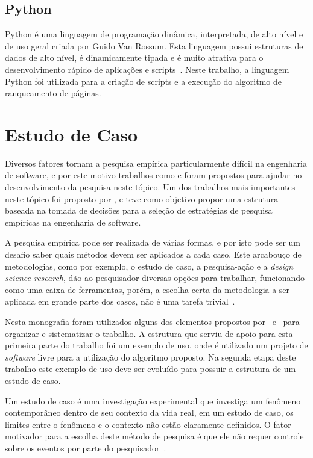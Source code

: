 \subsection{Python}
\label{met:tec:python}
Python é uma linguagem de programação dinâmica, interpretada, de alto nível e de  uso geral criada por Guido Van Rossum. Esta linguagem possui estruturas de dados de alto nível, é dinamicamente tipada e é muito atrativa para o desenvolvimento rápido de aplicações e scripts~\cite{python}. Neste trabalho, a linguagem Python foi utilizada para a criação de scripts e a execução do algoritmo de ranqueamento de páginas.


\section{Estudo de Caso}
\label{met:est}

Diversos fatores tornam a pesquisa empírica particularmente difícil na engenharia de software, e por este motivo trabalhos como  \cite{shaw} e \cite{empiricalSoftware} foram propostos para ajudar no desenvolvimento da pesquisa neste tópico. Um dos trabalhos mais importantes neste tópico foi proposto por \cite{empiricalSoftware}, e teve como objetivo propor uma estrutura baseada na tomada de decisões para a seleção de estratégias de pesquisa empíricas na engenharia de software.

A pesquisa empírica pode ser realizada de várias formas, e por isto pode ser um desafio saber quais métodos devem ser aplicados a cada caso. Este arcabouço de metodologias, como por exemplo, o estudo de caso, a pesquisa-ação e a \textit{design science research}, dão ao pesquisador diversas opções para trabalhar, funcionando como uma caixa de ferramentas, porém, a escolha certa da metodologia a ser aplicada em grande parte dos casos, não é uma tarefa trivial~\cite{empiricalSoftware}.

Nesta monografia foram utilizados alguns dos elementos propostos por~\cite{shaw} e~\cite{empiricalSoftware} para organizar e sistematizar o trabalho. A estrutura que serviu de apoio para esta primeira parte do trabalho foi um exemplo de uso, onde é utilizado um projeto de \textit{software} livre para a utilização do algoritmo proposto. Na segunda etapa deste trabalho este exemplo de uso deve ser evoluído para possuir a estrutura de um estudo de caso.

Um estudo de caso é uma investigação experimental que investiga um fenômeno contemporâneo dentro de seu contexto da vida real, em um estudo de caso, os limites entre o fenômeno e o contexto não estão claramente definidos. O fator motivador para a escolha deste método de pesquisa é que ele não requer controle sobre os eventos por parte do pesquisador~\cite{yin}.

